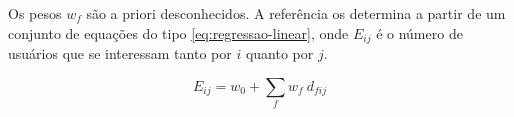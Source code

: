 Os pesos $w_f$ são a priori desconhecidos. A referência \cite{symeonidis2007feature} os determina a partir de um conjunto de equações do tipo \ref{eq:regressao-linear}, onde $E_{ij}$ é o número de usuários que se interessam tanto por $i$ quanto por $j$. 

\begin{equation}
\label{eq:regressao-linear} 
    E_{ij} = w_0 + \sum_{f}{w_{f} ~ d_{fij}}
\end{equation} 









%
%
